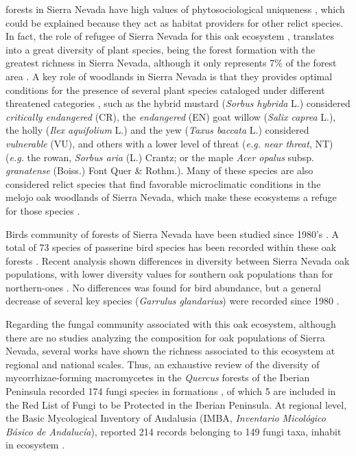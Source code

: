 \Qp forests in Sierra Nevada have high values of phytosociological uniqueness \autocites{Loriteetal2008PhytosociologicalReview}, which could be explained because they act as habitat providers for other relict species. In fact, the role of refugee of Sierra Nevada for this oak ecosystem \autocites{Breweretal2002SpreadDeciduous,Olaldeetal2002WhiteOaks,RodriguezSanchezetal2010TreeRange}, translates into a great diversity of plant species, being the forest formation with the greatest richness in Sierra Nevada, although it only represents 7\% of the forest area \autocites{PerezLuqueetal2014SinfonevadaDataset}. A key role of \Qp woodlands in Sierra Nevada is that they provides optimal conditions for the presence of several plant species cataloged under different threatened categories \autocites{Lorite2016UpdatedChecklist,Losaetal1986PaisajeVegetal,MelendoValle2000EstudioComparativo}, such as the hybrid mustard (\emph{Sorbus hybrida} L.) considered \emph{critically endangered} (CR), the \emph{endangered} (EN) goat willow (\emph{Salix caprea} L.), the holly (\emph{Ilex aquifolium} L.) and the yew (\emph{Taxus baccata} L.) considered \emph{vulnerable} (VU), and others with a lower level of threat (\emph{e.g.} \emph{near threat}, NT) (\emph{e.g.} the rowan, \emph{Sorbus aria} (L.) Crantz; or the maple \emph{Acer opalus} subsp. \emph{granatense} (Boiss.) Font Quer \& Rothm.). Many of these species are also considered relict species that find favorable microclimatic conditions in the melojo oak woodlands of Sierra Nevada, which make these ecosystems a refuge for those species \autocites{Blancaetal1998ThreatenedVascular,Lorite2016UpdatedChecklist,Losaetal1986PaisajeVegetal}. 

Birds community of \Qp forests of Sierra Nevada have been studied since 1980's \autocites{ZamoraCamacho1984EvolucionEstacional,ZamoraBareaAzcon2015LongTermChanges,BareaAzconetal2012PasseriformesOtras}. A total of 73 species of passerine bird species has been recorded within these oak forests \autocites{PerezLuqueetal2016DatasetPasserine}. Recent analysis shown differences in diversity between Sierra Nevada oak populations, with lower diversity values for southern oak populations than for northern-ones \autocites{PerezLuqueetal2021ManualGestion}. No differences was found for bird abundance, but a general decrease of several key species (\emph{Garrulus glandarius}) were recorded since 1980 \autocites{ZamoraBareaAzcon2015LongTermChanges}. 

Regarding the fungal community associated with this oak ecosystem, although there are no studies analyzing the composition for oak populations of Sierra Nevada, several works have shown the richness associated to this ecosystem at regional and national scales. Thus, an exhaustive review of the diversity of mycorrhizae-forming macromycetes in the \emph{Quercus} forests of the Iberian Peninsula recorded 174 fungi species in \Qp formations \autocites{Ortegaetal2010MycorrhizalMacrofungi}, of which 5 are included in the Red List of Fungi to be Protected in the Iberian Peninsula. At regional level, the Basic Mycological Inventory of Andalusia (IMBA, \emph{Inventario Micológico Básico de Andalucía}), reported 214 records belonging to 149 fungi taxa, inhabit in \Qp ecosystem \autocites{MorenoArroyo2004InventarioMicologico}. 

